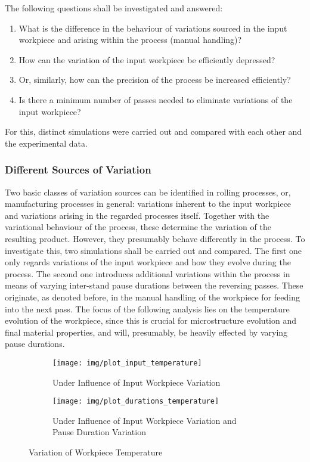 The following questions shall be investigated and answered:
\begin{enumerate}
    \item What is the difference in the behaviour of variations sourced in the input workpiece and arising within the process (manual handling)?
    \item How can the variation of the input workpiece be efficiently depressed?
    \item Or, similarly, how can the precision of the process be increased efficiently?
    \item Is there a minimum number of passes needed to eliminate variations of the input workpiece?
\end{enumerate}

For this, distinct simulations were carried out and compared with each other and the experimental data.

\subsubsection{Different Sources of Variation}\label{subsubsec:different-sources-of-variation}

Two basic classes of variation sources can be identified in rolling processes, or, manufacturing processes in general: variations inherent to the input workpiece and variations arising in the regarded processes itself.
Together with the variational behaviour of the process, these determine the variation of the resulting product.
However, they presumably behave differently in the process.
To investigate this, two simulations shall be carried out and compared.
The first one only regards variations of the input workpiece and how they evolve during the process.
The second one introduces additional variations within the process in means of varying inter-stand pause durations between the reversing passes.
These originate, as denoted before, in the manual handling of the workpiece for feeding into the next pass.
The focus of the following analysis lies on the temperature evolution of the workpiece, since this is crucial for microstructure evolution and final material properties, and will, presumably, be heavily effected by varying pause durations.

\begin{figure}
    \begin{subfigure}{\linewidth}
        \centering
        \texttt{[image: img/plot\_input\_temperature]}
        \caption{Under Influence of Input Workpiece Variation}
        \label{fig:plot_input_temperature}
    \end{subfigure}
    \begin{subfigure}{\linewidth}
        \centering
        \texttt{[image: img/plot\_durations\_temperature]}
        \caption{Under Influence of Input Workpiece Variation and Pause Duration Variation}
        \label{fig:plot_durations_temperature}
    \end{subfigure}
    \caption{Variation of Workpiece Temperature}
\end{figure}


